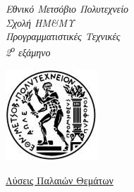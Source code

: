 \begin{titlepage}
\begin{center}

\noindent\begin{minipage}[b]{.55\textwidth}
\begin{Large}
\emph{Εθνικό Μετσόβιο Πολυτεχνείο\\
Σχολή ΗΜ\&ΜΥ\\
Προγραμματιστικές Τεχνικές\\
2\textsuperscript{ο} εξάμηνο}
\end{Large}
\end{minipage}%
\begin{minipage}[b]{.45\textwidth}
     \centering
     \includegraphics[scale=0.8]{title/ntua_logo}
\end{minipage}

\vspace{5cm}
\begin{huge}
\underline{Λύσεις Παλαιών Θεμάτων}
\end{huge}
\vfill

\vspace{1cm}

\end{center}
\end{titlepage}

